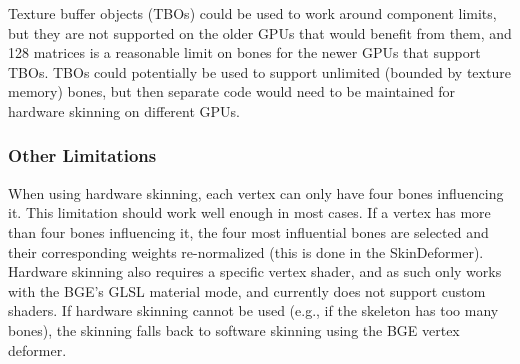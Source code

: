 Texture buffer objects (TBOs) could be used to work around component limits\cite{ARB_texture_buffer_object}, but they are not supported on the older GPUs that would benefit from them, and 128 matrices is a reasonable limit on bones for the newer GPUs that support TBOs.
TBOs could potentially be used to support unlimited (bounded by texture memory) bones, but then separate code would need to be maintained for hardware skinning on different GPUs.

\subsubsection{Other Limitations}

When using hardware skinning, each vertex can only have four bones influencing it.
This limitation should work well enough in most cases.
If a vertex has more than four bones influencing it, the four most influential bones are selected and their corresponding weights re-normalized (this is done in the SkinDeformer).
Hardware skinning also requires a specific vertex shader, and as such only works with the BGE's GLSL material mode, and currently does not support custom shaders.
If hardware skinning cannot be used (e.g., if the skeleton has too many bones), the skinning falls back to software skinning using the BGE vertex deformer.

